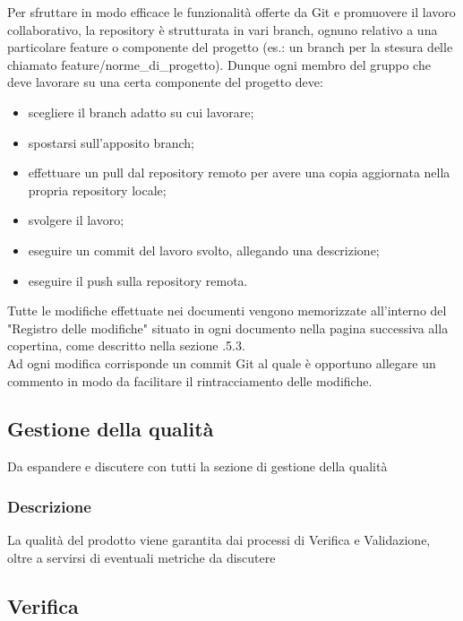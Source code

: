         Per sfruttare in modo efficace le funzionalità offerte da Git e promuovere il lavoro collaborativo, la repository è strutturata in vari branch, ognuno relativo a una particolare feature o componente del progetto (es.: un branch per la stesura delle \NdP chiamato feature/norme\_di\_progetto). Dunque ogni membro del gruppo che deve lavorare su una certa componente del progetto deve:
        \begin{itemize}
          \item scegliere il branch adatto su cui lavorare;
          \item spostarsi sull'apposito branch;
          \item effettuare un pull dal repository remoto per avere una copia aggiornata nella propria repository locale;
          \item svolgere il lavoro;
          \item eseguire un commit del lavoro svolto, allegando una descrizione;
          \item eseguire il push sulla repository remota.
        \end{itemize}

        Tutte le modifiche effettuate nei documenti vengono memorizzate all'interno del "Registro delle modifiche" situato in ogni documento nella pagina successiva alla copertina, come descritto nella sezione .5.3.\\
        Ad ogni modifica corrisponde un commit Git al quale è opportuno allegare un commento in modo da facilitare il rintracciamento delle modifiche.

  \subsection{Gestione della qualità}
    Da espandere e discutere con tutti la sezione di gestione della qualità
    \subsubsection{Descrizione}
      La qualità del prodotto viene garantita dai processi di Verifica e Validazione, oltre a servirsi di eventuali metriche da discutere

  \subsection{Verifica}
